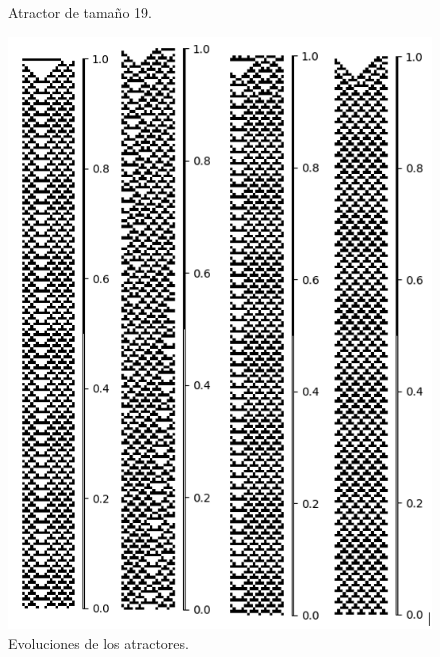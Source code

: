 \documentclass[11pt]{article}
\begin{document}
\begin{figure}[H]
			\caption{Atractor de tamaño 19.}\label{fig:picture}
			\end{figure}
			\begin{figure}[H]
			\centering
			\includegraphics[scale=0.3]{resources/Atractores54/atractor_54_size_19_res.png}
			\caption{Evoluciones de los atractores.}\label{fig:picture}
			\end{figure}
\end{document}
